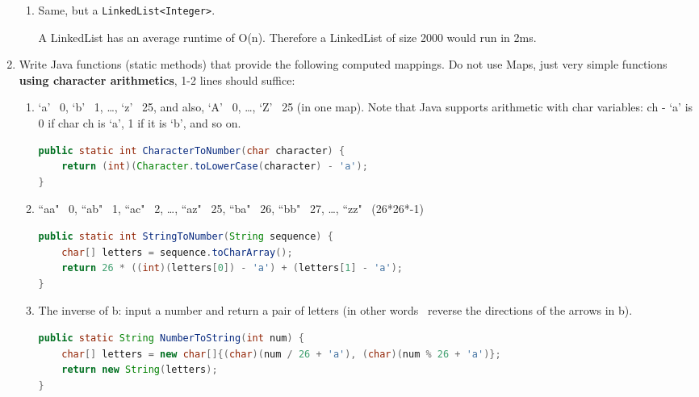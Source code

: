 \documentclass[letterpaper, 11pt]{article}
\begin{document}
\begin{enumerate}
\begin{enumerate}
        \item Same, but a \texttt{LinkedList<Integer>}.

        A LinkedList has an average runtime of O(n). Therefore a LinkedList of size 2000 would run in 2ms.
        
    \end{enumerate}
    \item Write Java functions (static methods) that provide the following computed mappings. Do not use Maps, just very simple functions \textbf{using character arithmetics}, 1-2 lines should suffice:
    \begin{enumerate}
        \item `a' \textrightarrow\ 0, `b' \textrightarrow\ 1, \ldots, `z' \textrightarrow\ 25, and also, `A' \textrightarrow\ 0, \ldots, `Z' \textrightarrow\ 25 (in one map). Note that Java supports arithmetic with char variables: ch - `a' is 0 if char ch is `a', 1 if it is `b', and so on.

\begin{tcolorbox}[breakable, title=\texttt{LetterMappings.java}]
\begin{lstlisting}[language=Java]
public static int CharacterToNumber(char character) {
    return (int)(Character.toLowerCase(character) - 'a');
}  
\end{lstlisting}
\end{tcolorbox}

        \item ``aa" \textrightarrow\ 0, ``ab" \textrightarrow\ 1, ``ac" \textrightarrow\ 2, \ldots, ``az" \textrightarrow\ 25, ``ba" \textrightarrow\ 26, ``bb" \textrightarrow\ 27, \ldots, ``zz" \textrightarrow\ (26*26*-1)

\begin{tcolorbox}[breakable, title=\texttt{LetterMappings.java}]
\begin{lstlisting}[language=Java]
public static int StringToNumber(String sequence) {
    char[] letters = sequence.toCharArray();
    return 26 * ((int)(letters[0]) - 'a') + (letters[1] - 'a');
}
\end{lstlisting}
\end{tcolorbox}
        
        \item The inverse of b: input a number and return a pair of letters (in other words \texthorizontalbar\ reverse the directions of the arrows in b).

\begin{tcolorbox}[breakable, title=\texttt{LetterMappings.java}]
\begin{lstlisting}[language=Java]
public static String NumberToString(int num) {
    char[] letters = new char[]{(char)(num / 26 + 'a'), (char)(num % 26 + 'a')};
    return new String(letters);
}
\end{lstlisting}
\end{tcolorbox}
        

\end{enumerate}
\end{enumerate}
\end{document}
